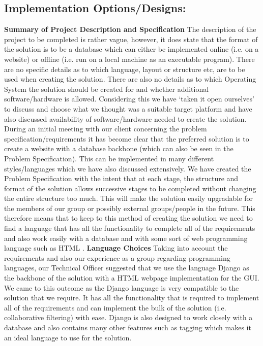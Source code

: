 \subsection{Implementation Options/Designs: }
\vspace {5 mm}
\textbf{Summary of Project Description and Specification}
\newline
\newline
The description of the project to be completed is rather vague, however, it does state that the format of the solution is to be a database which can either be implemented online (i.e. on a website) or offline (i.e. run on a local machine as an executable program). There are no specific details as to which language, layout or structure etc, are to be used when creating the solution. There are also no details as to which Operating System the solution should be created for and whether additional software/hardware is allowed. Considering this we have ‘taken it open ourselves’ to discuss and choose what we thought was a suitable target platform and have also discussed availability of software/hardware needed to create the solution.
During an initial meeting with our client concerning the problem specification/requirements it has become clear that the preferred solution is to create a website with a database backbone (which can also be seen in the Problem Specification). This can be implemented in many different styles/languages which we have also discussed extensively. 
We have created the Problem Specification with the intent that at each stage, the structure and format of the solution allows successive stages to be completed without changing the entire structure too much. This will make the solution easily upgradable for the members of our group or possibly external groups/people in the future. This therefore means that to keep to this method of creating the solution we need to find a language that has all the functionality to complete all of the requirements and also work easily with a database and with some sort of web programming language such as HTML .
\newline
\newline
\textbf{Language Choices}
\newline
\newline
Taking into account the requirements and also our experience as a group regarding programming languages, our Technical Officer suggested that we use the language Django as the backbone of the solution with a HTML webpage implementation for the GUI. We came to this outcome as the Django language is very compatible to the solution that we require. It has all the functionality that is required to implement all of the requirements and can implement the bulk of the solution (i.e. collaborative filtering) with ease. Django is also designed to work closely with a database and also contains many other features such as tagging which makes it an ideal language to use for the solution.
